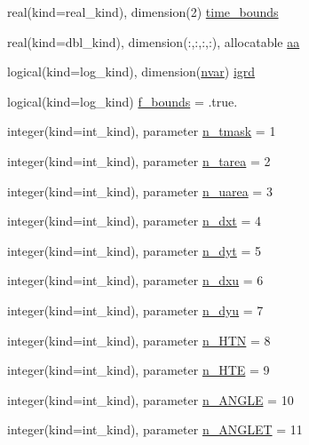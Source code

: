 \begin{DoxyCompactItemize}
\item 
real(kind=real\_\-kind), dimension(2) \hyperlink{namespaceice__history__fields_af1a62dc90d229ad2a1f46e618e3903d3}{time\_\-bounds}
\item 
real(kind=dbl\_\-kind), dimension(:,:,:,:), allocatable \hyperlink{namespaceice__history__fields_af5f594399a95ba6eccac351207392285}{aa}
\item 
logical(kind=log\_\-kind), dimension(\hyperlink{namespaceice__history__fields_a36bf5fe8de5bdf3f0fa9bd6840536a96}{nvar}) \hyperlink{namespaceice__history__fields_a7efcc39b544df18b2e0d1952257eb758}{igrd}
\item 
logical(kind=log\_\-kind) \hyperlink{namespaceice__history__fields_a2f3cd20e9232a9ef13482e90435469dc}{f\_\-bounds} = .true.
\item 
integer(kind=int\_\-kind), parameter \hyperlink{namespaceice__history__fields_a357c5d0fb7837fb0461704f23f46d101}{n\_\-tmask} = 1
\item 
integer(kind=int\_\-kind), parameter \hyperlink{namespaceice__history__fields_aede613891c36b6de42a6b5dfa94a6c47}{n\_\-tarea} = 2
\item 
integer(kind=int\_\-kind), parameter \hyperlink{namespaceice__history__fields_a40dda082d8b468c6159dfd8d7fe5763d}{n\_\-uarea} = 3
\item 
integer(kind=int\_\-kind), parameter \hyperlink{namespaceice__history__fields_a613db804c0915e1be10166a897ae5620}{n\_\-dxt} = 4
\item 
integer(kind=int\_\-kind), parameter \hyperlink{namespaceice__history__fields_a7489b539895f4c90f2ac32cef942834d}{n\_\-dyt} = 5
\item 
integer(kind=int\_\-kind), parameter \hyperlink{namespaceice__history__fields_abf7b5bd4ffe0fce783bbb9305b92e08c}{n\_\-dxu} = 6
\item 
integer(kind=int\_\-kind), parameter \hyperlink{namespaceice__history__fields_ae9ef4bdaa9a78373d8e7a64434e63832}{n\_\-dyu} = 7
\item 
integer(kind=int\_\-kind), parameter \hyperlink{namespaceice__history__fields_a2fd568cf96c89f8164ffb0a11143bdbe}{n\_\-HTN} = 8
\item 
integer(kind=int\_\-kind), parameter \hyperlink{namespaceice__history__fields_ae2441593355b72e80279087bc9b631c3}{n\_\-HTE} = 9
\item 
integer(kind=int\_\-kind), parameter \hyperlink{namespaceice__history__fields_a130bc8773e91330b2369823f37e4c9c3}{n\_\-ANGLE} = 10
\item 
integer(kind=int\_\-kind), parameter \hyperlink{namespaceice__history__fields_a253f0d4683bb614814edffa539758e3f}{n\_\-ANGLET} = 11

\end{DoxyCompactItemize}
